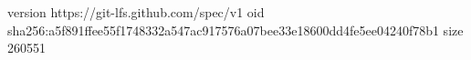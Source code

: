 version https://git-lfs.github.com/spec/v1
oid sha256:a5f891ffee55f1748332a547ac917576a07bee33e18600dd4fe5ee04240f78b1
size 260551
